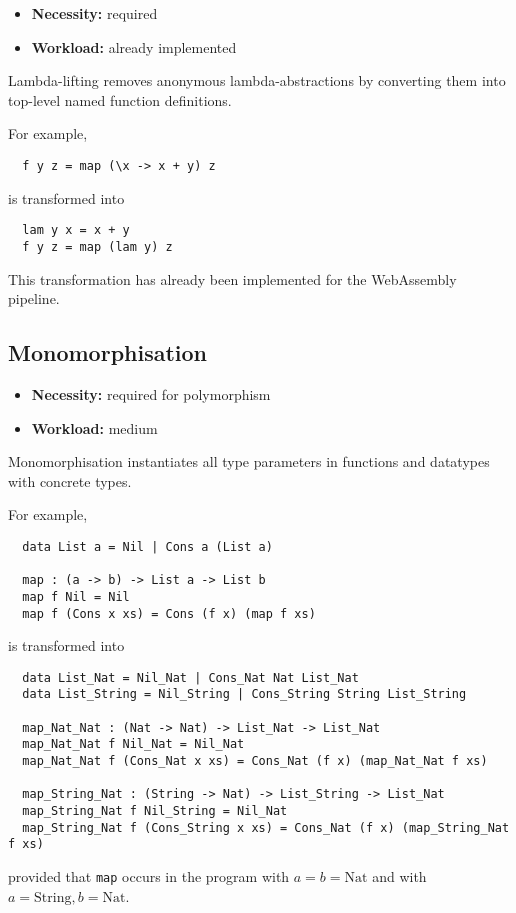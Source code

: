 \documentclass[final]{msc}
\begin{document}
\begin{itemize}
\item {\bf Necessity:} required
\item {\bf Workload:} already implemented
\end{itemize}

\noindent Lambda-lifting removes anonymous lambda-abstractions by converting
them into top-level named function definitions.

\medskip

\noindent For example,
\begin{verbatim}
  f y z = map (\x -> x + y) z
\end{verbatim}
is transformed into
\begin{verbatim}
  lam y x = x + y
  f y z = map (lam y) z
\end{verbatim}
This transformation has already been implemented for the WebAssembly pipeline.

\subsection{Monomorphisation}

\begin{itemize}
\item {\bf Necessity:} required for polymorphism
\item {\bf Workload:} medium
\end{itemize}

\noindent Monomorphisation instantiates all type parameters in
functions and datatypes with concrete types.

\medskip

\noindent For example,
\begin{verbatim}
  data List a = Nil | Cons a (List a)

  map : (a -> b) -> List a -> List b
  map f Nil = Nil
  map f (Cons x xs) = Cons (f x) (map f xs)
\end{verbatim}
is transformed into
\begin{verbatim}
  data List_Nat = Nil_Nat | Cons_Nat Nat List_Nat
  data List_String = Nil_String | Cons_String String List_String

  map_Nat_Nat : (Nat -> Nat) -> List_Nat -> List_Nat
  map_Nat_Nat f Nil_Nat = Nil_Nat
  map_Nat_Nat f (Cons_Nat x xs) = Cons_Nat (f x) (map_Nat_Nat f xs)

  map_String_Nat : (String -> Nat) -> List_String -> List_Nat
  map_String_Nat f Nil_String = Nil_Nat
  map_String_Nat f (Cons_String x xs) = Cons_Nat (f x) (map_String_Nat f xs)
\end{verbatim}
provided that \texttt{map} occurs in the program with $a = b =
\mathrm{Nat}$ and with $a = \mathrm{String}, b = \mathrm{Nat}$.
\end{document}
